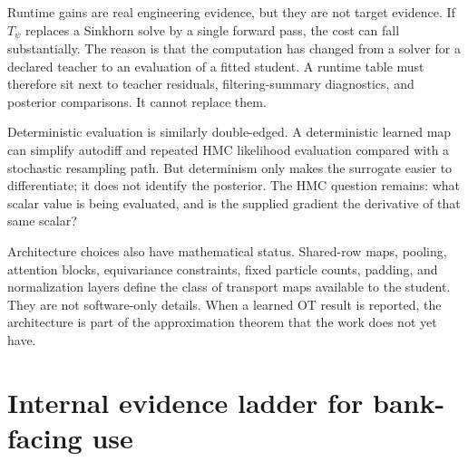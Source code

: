 Runtime gains are real engineering evidence, but they are not target evidence.
If $T_\psi$ replaces a Sinkhorn solve by a single forward pass, the cost can
fall substantially.  The reason is that the computation has changed from a
solver for a declared teacher to an evaluation of a fitted student.  A runtime
table must therefore sit next to teacher residuals, filtering-summary
diagnostics, and posterior comparisons.  It cannot replace them.

Deterministic evaluation is similarly double-edged.  A deterministic learned
map can simplify autodiff and repeated HMC likelihood evaluation compared with a
stochastic resampling path.  But determinism only makes the surrogate easier to
differentiate; it does not identify the posterior.  The HMC question remains:
what scalar value is being evaluated, and is the supplied gradient the
derivative of that same scalar?

Architecture choices also have mathematical status.  Shared-row maps, pooling,
attention blocks, equivariance constraints, fixed particle counts, padding, and
normalization layers define the class of transport maps available to the
student.  They are not software-only details.  When a learned OT result is
reported, the architecture is part of the approximation theorem that the work
does not yet have.

\section{Internal evidence ladder for bank-facing use}
\label{sec:bf-learned-ot-banking-evidence}

